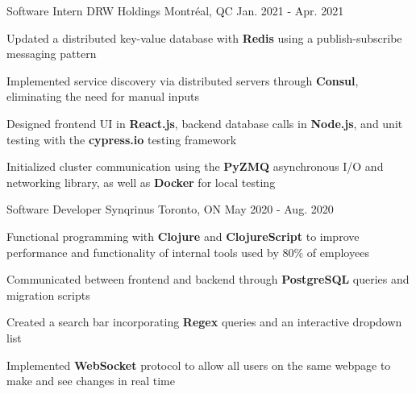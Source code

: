 

\begin{cventries}

  \cventry
    {Software Intern} %
    {DRW Holdings} %
    {Montréal, QC} %
    {Jan. 2021 - Apr. 2021} %
    {
      \begin{cvitems} %
        \item {Updated a distributed key-value database with \textbf{Redis} using a publish-subscribe messaging pattern}
        \item {Implemented service discovery via distributed servers through \textbf{Consul}, eliminating the need for manual inputs}
        \item {Designed frontend UI in \textbf{React.js}, backend database calls in \textbf{Node.js}, and unit testing with the \textbf{cypress.io} testing framework}
        \item {Initialized cluster communication using the \textbf{PyZMQ} asynchronous I/O and networking library, as well as \textbf{Docker} for local testing}
      \end{cvitems}
    }

  \cventry
    {Software Developer} %
    {Synqrinus} %
    {Toronto, ON} %
    {May 2020 - Aug. 2020} %
    {
      \begin{cvitems} %
        \item {Functional programming with \textbf{Clojure} and \textbf{ClojureScript} to improve performance and functionality of internal tools used by 80\% of employees}
        \item {Communicated between frontend and backend through \textbf{PostgreSQL} queries and migration scripts}
        \item {Created a search bar incorporating \textbf{Regex} queries and an interactive dropdown list}
        \item {Implemented \textbf{WebSocket} protocol to allow all users on the same webpage to make and see changes in real time}
      \end{cvitems}
    }


\end{cventries}
